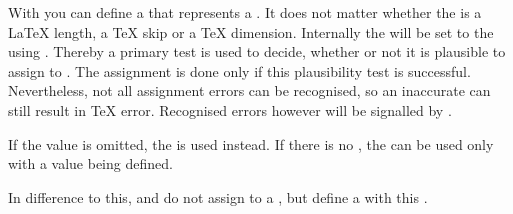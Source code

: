 \begin{Declaration}
  \\
  \\
  \\
  \\
  \\
\end{Declaration}
%
%
%
%
With  you can
define a  that represents a . It does not matter
whether the  is a \LaTeX{} length, a \TeX{} skip or a \TeX{}
dimension. Internally the  will be set to the 
using . Thereby a primary test is used to decide,
whether or not it is plausible to assign  to . The
assignment is done only if this plausibility test is successful. Nevertheless,
not all assignment errors can be recognised, so an inaccurate 
can still result in \TeX{} error. Recognised errors however will be signalled
by .

If the value is omitted,
the  is used instead. If there is no , the
 can be used only with a value being defined.

In difference to this,  and
 do not assign  to a ,
but define a  with this
.%
%
%
%
%

